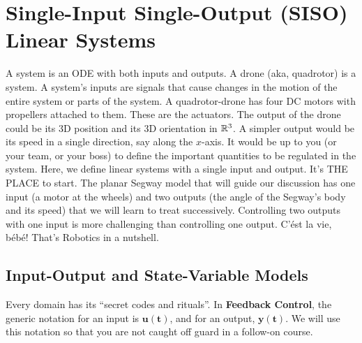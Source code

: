 


\section{Single-Input Single-Output (SISO) Linear Systems}

A system is an ODE with both inputs and outputs. A drone (aka, quadrotor) is a system. A system's inputs are signals that cause changes in the motion of the entire system or parts of the system. A quadrotor-drone has four DC motors with propellers attached to them. These are the actuators. The output of the drone could be its 3D position and its 3D orientation in $\mathbb R^3$. A simpler output would be its speed in a single direction, say along the $x$-axis. It would be up to you (or your team, or your boss) to define the important quantities to be regulated in the system. Here, we define linear systems with a single input and output. It's THE PLACE to start. The planar Segway model that will guide our discussion has one input (a motor at the wheels) and two outputs (the angle of the Segway's body and its speed) that we will learn to treat successively. Controlling two outputs with one input is more challenging than controlling one output. C'\'est la vie, b\'eb\'e! That's Robotics in a nutshell. \\

\subsection{Input-Output and State-Variable Models}

Every domain has its ``secret codes and rituals''. In \textbf{Feedback Control}, the generic notation for an input is $\bm{u(t)}$, and for an output, $\bm{y(t)}$. We will use this notation so that you are not caught off guard in a follow-on course.


\vspace*{.2cm}

